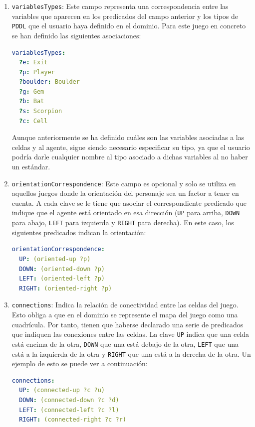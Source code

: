 \begin{enumerate}
    \item \texttt{variablesTypes}: Este campo representa una correspondencia entre las variables que
    aparecen en los predicados del campo anterior y los tipos de \texttt{PDDL} que el usuario haya definido
    en el dominio. Para este juego en concreto se han definido las siguientes asociaciones:
    
    \begin{lstlisting}[language=yaml]
variablesTypes:
  ?e: Exit
  ?p: Player
  ?boulder: Boulder
  ?g: Gem
  ?b: Bat
  ?s: Scorpion
  ?c: Cell
    \end{lstlisting}
    
    Aunque anteriormente se ha definido cuáles son las variables asociadas a las celdas y al agente,
    sigue siendo necesario especificar su tipo, ya que el usuario podría darle cualquier nombre al
    tipo asociado a dichas variables al no haber un estándar.
    
    \item \texttt{orientationCorrespondence}: Este campo es opcional y solo se utiliza en aquellos
    juegos donde la orientación del personaje sea un factor a tener en cuenta. A cada clave se le
    tiene que asociar el correspondiente predicado que indique que el agente está orientado en esa
    dirección (\texttt{UP} para arriba, \texttt{DOWN} para abajo, \texttt{LEFT} para izquierda
    y \texttt{RIGHT} para derecha). En este caso, los siguientes predicados indican la orientación:
    
    \begin{lstlisting}[language=yaml]
orientationCorrespondence:
  UP: (oriented-up ?p)
  DOWN: (oriented-down ?p)
  LEFT: (oriented-left ?p)
  RIGHT: (oriented-right ?p) 
    \end{lstlisting}
    
    \item \texttt{connections}: Indica la relación de conectividad entre las celdas del juego.
    Esto obliga a que en el dominio se represente el mapa del juego como una cuadrícula. Por tanto, tienen
    que haberse declarado una serie de predicados que indiquen las conexiones entre las celdas. La clave
    \texttt{UP} indica que una celda está encima de la otra, \texttt{DOWN} que una está debajo de la otra,
    \texttt{LEFT} que una está a la izquierda de la otra y \texttt{RIGHT} que una está a la derecha de
    la otra. Un ejemplo de esto se puede ver a continuación:
    
    \begin{lstlisting}[language=yaml]
connections:
  UP: (connected-up ?c ?u)
  DOWN: (connected-down ?c ?d)
  LEFT: (connected-left ?c ?l)
  RIGHT: (connected-right ?c ?r)
    \end{lstlisting}
    

\end{enumerate}
